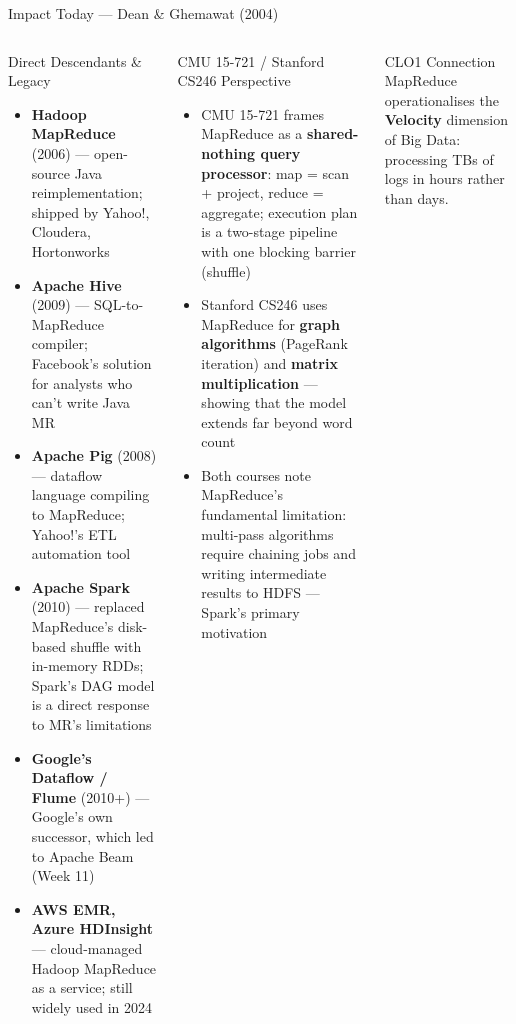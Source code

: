 \documentclass[aspectratio=169,10pt]{beamer}
\begin{document}
\begin{frame}{Impact Today — Dean \& Ghemawat (2004)}
  \begin{columns}[T]
      \begin{block}{Direct Descendants \& Legacy}
        \begin{itemize}
          \item \textbf{Hadoop MapReduce} (2006) — open-source Java
                reimplementation; shipped by Yahoo!, Cloudera, Hortonworks
          \item \textbf{Apache Hive} (2009) — SQL-to-MapReduce compiler;
                Facebook's solution for analysts who can't write Java MR
          \item \textbf{Apache Pig} (2008) — dataflow language compiling
                to MapReduce; Yahoo!'s ETL automation tool
          \item \textbf{Apache Spark} (2010) — replaced MapReduce's
                disk-based shuffle with in-memory RDDs;
                Spark's DAG model is a direct response to MR's limitations
          \item \textbf{Google's Dataflow / Flume} (2010+) — Google's
                own successor, which led to Apache Beam (Week 11)
          \item \textbf{AWS EMR, Azure HDInsight} — cloud-managed Hadoop
                MapReduce as a service; still widely used in 2024
        \end{itemize}
      \end{block}

      \begin{exampleblock}{CMU 15-721 / Stanford CS246 Perspective}
        \begin{itemize}
          \item CMU 15-721 frames MapReduce as a
                \textbf{shared-nothing query processor}: map = scan +
                project, reduce = aggregate; execution plan is a
                two-stage pipeline with one blocking barrier (shuffle)
          \item Stanford CS246 uses MapReduce for
                \textbf{graph algorithms} (PageRank iteration) and
                \textbf{matrix multiplication} — showing that the
                model extends far beyond word count
          \item Both courses note MapReduce's fundamental limitation:
                multi-pass algorithms require chaining jobs and writing
                intermediate results to HDFS — Spark's primary motivation
        \end{itemize}
      \end{exampleblock}
      \vspace{4pt}
      \begin{alertblock}{CLO1 Connection}
        MapReduce operationalises the \textbf{Velocity} dimension of
        Big Data: processing TBs of logs in hours rather than days.
      \end{alertblock}
  \end{columns}
\end{frame}
\end{document}

